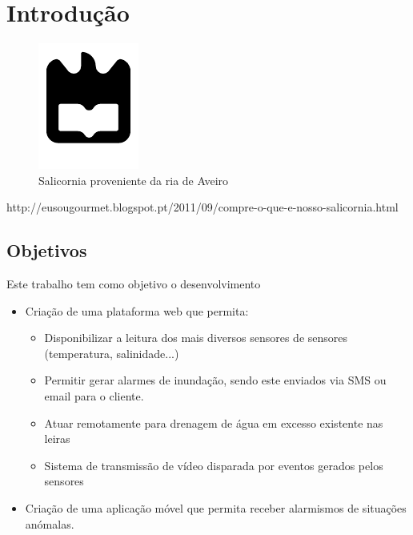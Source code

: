 \chapter{Introdução}




\begin{figure}[!htb]
\centering
\includegraphics{uaLogoNew.pdf}
\caption{Salicornia proveniente da ria de Aveiro}
\label{Rotulo}
\end{figure}








http://eusougourmet.blogspot.pt/2011/09/compre-o-que-e-nosso-salicornia.html







\section{Objetivos}

Este trabalho tem como objetivo o desenvolvimento

\begin{itemize}
    \item Criação de uma plataforma web que permita: 

    \begin{itemize}
        \item Disponibilizar a leitura dos mais diversos sensores de sensores (temperatura, salinidade...)
        
        \item Permitir gerar alarmes de inundação, sendo este enviados via SMS ou email para o cliente. 
        
        \item Atuar remotamente para drenagem de água em excesso existente nas leiras
        
        \item Sistema de transmissão de vídeo disparada por eventos gerados pelos sensores
        
        
    \end{itemize}
    
    \item Criação de uma aplicação móvel que permita receber alarmismos de situações anómalas. 
\end{itemize}



